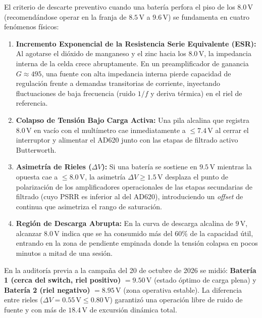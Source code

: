 \documentclass[11pt,a4paper]{article}
\begin{document}
El criterio de descarte preventivo cuando una batería perfora el piso de los $8.0\,\text{V}$ (recomendándose operar en la franja de $8.5\,\text{V}$ a $9.6\,\text{V}$) se fundamenta en cuatro fenómenos físicos:
\begin{enumerate}
    \item \textbf{Incremento Exponencial de la Resistencia Serie Equivalente (ESR):} Al agotarse el dióxido de manganeso y el zinc hacia los $8.0\,\text{V}$, la impedancia interna de la celda crece abruptamente. En un preamplificador de ganancia $G \approx 495$, una fuente con alta impedancia interna pierde capacidad de regulación frente a demandas transitorias de corriente, inyectando fluctuaciones de baja frecuencia (ruido $1/f$ y deriva térmica) en el riel de referencia.
    \item \textbf{Colapso de Tensión Bajo Carga Activa:} Una pila alcalina que registra $8.0\,\text{V}$ en vacío con el multímetro cae inmediatamente a $\le 7.4\,\text{V}$ al cerrar el interruptor y alimentar el AD620 junto con las etapas de filtrado activo Butterworth.
    \item \textbf{Asimetría de Rieles ($\Delta V$):} Si una batería se sostiene en $9.5\,\text{V}$ mientras la opuesta cae a $\le 8.0\,\text{V}$, la asimetría $\Delta V \ge 1.5\,\text{V}$ desplaza el punto de polarización de los amplificadores operacionales de las etapas secundarias de filtrado (cuyo PSRR es inferior al del AD620), introduciendo un \textit{offset} de continua que asimetriza el rango de saturación.
    \item \textbf{Región de Descarga Abrupta:} En la curva de descarga alcalina de $9\,\text{V}$, alcanzar $8.0\,\text{V}$ indica que se ha consumido más del $60\%$ de la capacidad útil, entrando en la zona de pendiente empinada donde la tensión colapsa en pocos minutos a mitad de una sesión.
\end{enumerate}

En la auditoría previa a la campaña del 20 de octubre de 2026 se midió: \textbf{Batería 1 (cerca del switch, riel positivo)} $= 9.50\,\text{V}$ (estado óptimo de carga plena) y \textbf{Batería 2 (riel negativo)} $= 8.95\,\text{V}$ (zona operativa estable). La diferencia entre rieles ($\Delta V = 0.55\,\text{V} \le 0.80\,\text{V}$) garantizó una operación libre de ruido de fuente y con más de $18.4\,\text{V}$ de excursión dinámica total.

\end{document}
